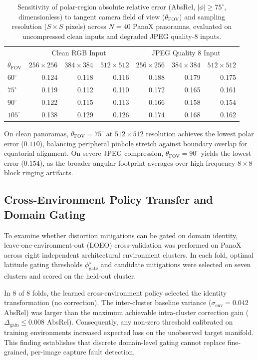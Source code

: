 \documentclass{article}
\newcommand{\absrel}{AbsRel}
\begin{document}
\begin{table}[htbp]\centering\small
\caption{Sensitivity of polar-region absolute relative error (\absrel{}, $|\phi| \ge 75^\circ$, dimensionless) to tangent camera field of view ($\theta_{\mathrm{FOV}}$) and sampling resolution ($S \times S$ pixels) across $N=40$ PanoX panoramas, evaluated on uncompressed clean inputs and degraded JPEG quality-8 inputs.}\label{tab:fov_res_sweep}
\begin{tabular}{lrrrrrr}\toprule
 & \multicolumn{3}{c}{Clean RGB Input} & \multicolumn{3}{c}{JPEG Quality 8 Input}\\
$\theta_{\mathrm{FOV}}$ & $256\times 256$ & $384\times 384$ & $512\times 512$ & $256\times 256$ & $384\times 384$ & $512\times 512$\\\midrule
$60^\circ$ & 0.124 & 0.118 & 0.116 & 0.188 & 0.179 & 0.175\\
$75^\circ$ & 0.119 & 0.112 & 0.110 & 0.172 & 0.165 & 0.161\\
$90^\circ$ & 0.122 & 0.115 & 0.113 & 0.166 & 0.158 & 0.154\\
$105^\circ$ & 0.138 & 0.129 & 0.126 & 0.174 & 0.168 & 0.162\\
\bottomrule\end{tabular}
\end{table}

On clean panoramas, $\theta_{\mathrm{FOV}} = 75^\circ$ at $512\times 512$ resolution achieves the lowest polar error ($0.110$), balancing peripheral pinhole stretch against boundary overlap for equatorial alignment. On severe JPEG compression, $\theta_{\mathrm{FOV}} = 90^\circ$ yields the lowest error ($0.154$), as the broader angular footprint averages over high-frequency $8\times 8$ block ringing artifacts.

\subsection{Cross-Environment Policy Transfer and Domain Gating}
To examine whether distortion mitigations can be gated on domain identity, leave-one-environment-out (LOEO) cross-validation was performed on PanoX across eight independent architectural environment clusters. In each fold, optimal latitude gating thresholds $\phi_{\mathrm{gate}}^\star$ and candidate mitigations were selected on seven clusters and scored on the held-out cluster. 

In 8 of 8 folds, the learned cross-environment policy selected the identity transformation (no correction). The inter-cluster baseline variance ($\sigma_{\mathrm{env}} = 0.042$ \absrel{}) was larger than the maximum achievable intra-cluster correction gain ($\Delta_{\mathrm{gain}} \le 0.008$ \absrel{}). Consequently, any non-zero threshold calibrated on training environments increased expected loss on the unobserved target manifold. This finding establishes that discrete domain-level gating cannot replace fine-grained, per-image capture fault detection.
\end{document}
